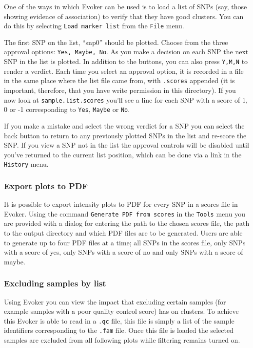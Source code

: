 \documentclass{article}
\begin{document}
One of the ways in which Evoker can be used is to load a list of SNPs (say, those showing evidence of association) to verify that they have good clusters. You can do this by selecting \texttt{Load marker list} from the \texttt{File} menu.

The first SNP on the list, ``snp0'' should be plotted. Choose from the three approval options: \texttt{Yes, Maybe, No}. As you make a decision on each SNP the next SNP in the list is plotted. In addition to the buttons, you can also press \texttt{Y,M,N} to render a verdict. Each time you select an approval option, it is recorded in a file in the same place where the list file came from, with \texttt{.scores} appended (it is important, therefore, that you have write permission in this directory). If you now look at \texttt{sample.list.scores} you'll see a line for each SNP with a score of 1, 0 or -1 corresponding to \texttt{Yes}, \texttt{Maybe} or \texttt{No}. 

If you make a mistake and select the wrong verdict for a SNP you can select the back button to return to any previously plotted SNPs in the list and re-score the SNP. If you view a SNP not in the list the approval controls will be disabled until you've returned to the current list position, which can be done via a link in the \texttt{History} menu.

\subsubsection{Export plots to PDF}

It is possible to export intensity plots to PDF for every SNP in a scores file in Evoker. Using the command \texttt{Generate PDF from scores} in the \texttt{Tools} menu you are provided with a dialog for entering the path to the chosen scores file, the path to the output directory and which PDF files are to be generated. Users are able to generate up to four PDF files at a time; all SNPs in the scores file, only SNPs with a score of yes, only SNPs with a score of no and only SNPs with a score of maybe.  

\subsubsection{Excluding samples by list}
Using Evoker you can view the impact that excluding certain samples (for example samples with a poor quality control score) has on clusters. To achieve this Evoker is able to read in a \texttt{.qc} file, this file is simply a list of the sample identifiers corresponding to the \texttt{.fam} file. Once this file is loaded the selected samples are excluded from all following plots while filtering remains turned on.
\end{document}
